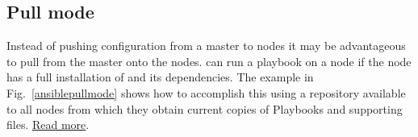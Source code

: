 \subsection*{Pull mode}

Instead of pushing configuration from a master to nodes it may be advantageous to pull from the master onto the nodes.
\ansible{} can run a playbook on a node if the node has a full installation of \ansible{} and its dependencies.
The example in Fig.~\ref{ansiblepullmode} shows how to accomplish this using a repository available to all nodes from which they obtain current copies of Playbooks and supporting files. \href{http://jpmens.net/2012/07/14/ansible-pull-instead-of-push/}{Read more}.

